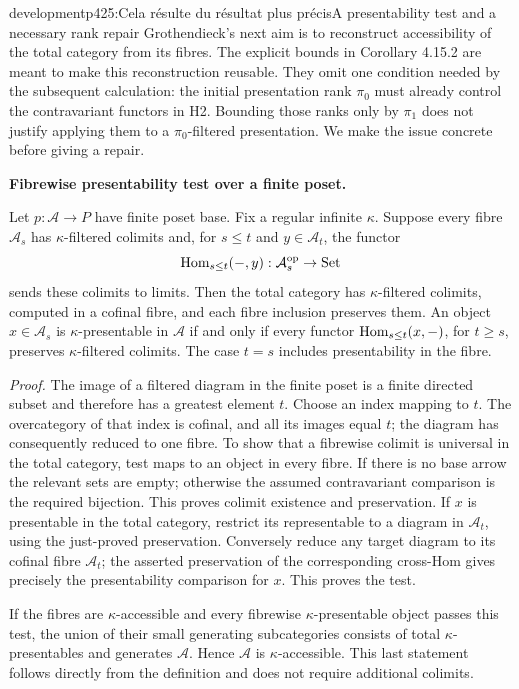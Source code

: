 \begin{dcomment}{development}{p425:Cela résulte du résultat plus précis}{A presentability test and a necessary rank repair}
Grothendieck's next aim is to reconstruct accessibility of the total category from its fibres. The explicit bounds in Corollary 4.15.2 are meant to make this reconstruction reusable. They omit one condition needed by the subsequent calculation: the initial presentation rank $\pi_0$ must already control the contravariant functors in H2. Bounding those ranks only by $\pi_1$ does not justify applying them to a $\pi_0$-filtered presentation. We make the issue concrete before giving a repair.

\textbf{Fibrewise presentability test over a finite poset.}\ours\ 

Let $p:\mathcal A\to P$ have finite poset base. Fix a regular infinite $\kappa$. Suppose every fibre $\mathcal A_s$ has $\kappa$-filtered colimits and, for $s\leq t$ and $y\in\mathcal A_t$, the functor
\[
 \operatorname{Hom}_{s\leq t}(-,y):\mathcal A_s^{\mathrm{op}}\to\mathrm{Set}
\]
sends these colimits to limits. Then the total category has $\kappa$-filtered colimits, computed in a cofinal fibre, and each fibre inclusion preserves them. An object $x\in\mathcal A_s$ is $\kappa$-presentable in $\mathcal A$ if and only if every functor $\operatorname{Hom}_{s\leq t}(x,-)$, for $t\geq s$, preserves $\kappa$-filtered colimits. The case $t=s$ includes presentability in the fibre.

\emph{Proof.} The image of a filtered diagram in the finite poset is a finite directed subset and therefore has a greatest element $t$. Choose an index mapping to $t$. The overcategory of that index is cofinal, and all its images equal $t$; the diagram has consequently reduced to one fibre. To show that a fibrewise colimit is universal in the total category, test maps to an object in every fibre. If there is no base arrow the relevant sets are empty; otherwise the assumed contravariant comparison is the required bijection. This proves colimit existence and preservation. If $x$ is presentable in the total category, restrict its representable to a diagram in $\mathcal A_t$, using the just-proved preservation. Conversely reduce any target diagram to its cofinal fibre $\mathcal A_t$; the asserted preservation of the corresponding cross-Hom gives precisely the presentability comparison for $x$. This proves the test.

If the fibres are $\kappa$-accessible and every fibrewise $\kappa$-presentable object passes this test, the union of their small generating subcategories consists of total $\kappa$-presentables and generates $\mathcal A$. Hence $\mathcal A$ is $\kappa$-accessible. This last statement follows directly from the definition and does not require additional colimits.


\end{dcomment}
